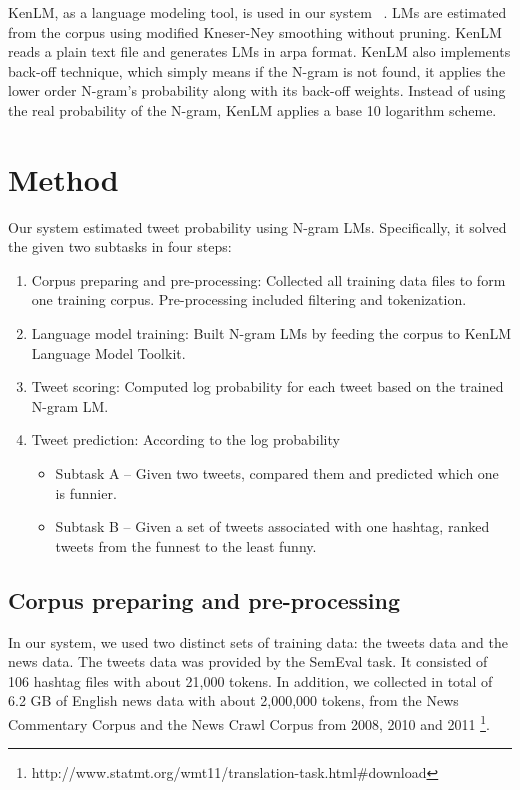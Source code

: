 \documentclass[11pt,a4paper]{article}
\begin{document}
KenLM, as a language modeling tool, is used in our system ~\cite{Heafield-estimate}. LMs are estimated from the corpus using modified Kneser-Ney smoothing without pruning. KenLM reads a plain text file and generates LMs in arpa format. KenLM also implements back-off technique, which simply means if the N-gram is not found, it applies the lower order N-gram's probability along with its back-off weights. Instead of using the real probability of the N-gram, KenLM applies a base 10 logarithm scheme.

\section{Method}
Our system estimated tweet probability using N-gram LMs. Specifically, it solved the given two subtasks in four steps:
\begin{enumerate}
\item Corpus preparing and pre-processing: Collected all training data files to form one training corpus. Pre-processing included filtering and tokenization.
\item Language model training: Built N-gram LMs by feeding the corpus to KenLM Language Model Toolkit. 
\item Tweet scoring: Computed log probability for each tweet based on the trained N-gram LM.
\item Tweet prediction: According to the log probability
\begin{itemize}
\item Subtask A -- Given two tweets, compared them and predicted which one is funnier. 
\item Subtask B -- Given a set of tweets associated with one hashtag, ranked tweets from the funnest to the least funny.
\end{itemize}
\end{enumerate}

\subsection{Corpus preparing and pre-processing}
In our system, we used two distinct sets of training data: the tweets data and the news data. The tweets data was provided by the SemEval task. It consisted of 106 hashtag files with about 21,000 tokens. In addition, we collected in total of 6.2 GB of English news data with about 2,000,000 tokens, from the News Commentary Corpus and the News Crawl Corpus from 2008, 2010 and 2011 \footnote{http://www.statmt.org/wmt11/translation-task.html\#download}.   
\end{document}
